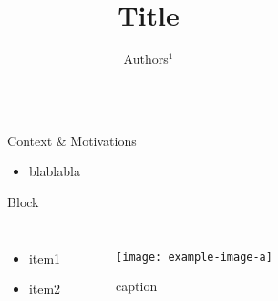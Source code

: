 \documentclass[final,hyperref={pdfpagelabels=false}]{beamer}
\title{\huge Title} %
\author{\normalsize Authors$^1$} %
\institute{\small$^1$ Northern Robotics Laboratory, Universit\'e Laval} %
\begin{document}

\begin{frame}[t] %

  \begin{columns}[t] %

    \begin{column}{.02\textwidth}\end{column} %

    \begin{column}{.465\textwidth} %


      \begin{block}{Context \& Motivations}
        \begin{itemize}
          \item blablabla
        \end{itemize}
      \end{block}

      \begin{block}{Block}
        \begin{columns} %

          \begin{minipage}{.58\textwidth} %
            \begin{itemize}
              \item item1
              \item item2
            \end{itemize}
          \end{minipage}

          \begin{minipage}{.42\textwidth} %
            \centering
            \begin{figure}
              \texttt{[image: example-image-a]}
              \caption{caption}
            \end{figure}
          \end{minipage}


\end{columns}
\end{block}
\end{column}
\end{columns}
\end{frame}
\end{document}
